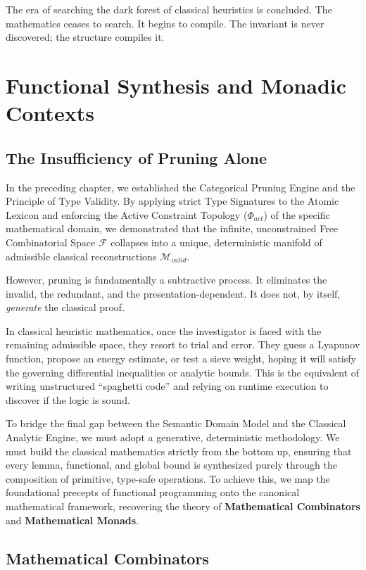 \documentclass[12pt,openany]{extbook}
\theoremstyle{plain}
\theoremstyle{definition}
\begin{document}
The era of searching the dark forest of classical heuristics is concluded. The mathematics ceases to search. It begins to compile. The invariant is never discovered; the structure compiles it.

\chapter{Functional Synthesis and Monadic Contexts}

\section{The Insufficiency of Pruning Alone}

In the preceding chapter, we established the Categorical Pruning Engine and the Principle of Type Validity. By applying strict Type Signatures to the Atomic Lexicon and enforcing the Active Constraint Topology ($\Phi_{act}$) of the specific mathematical domain, we demonstrated that the infinite, unconstrained Free Combinatorial Space $\mathcal{F}$ collapses into a unique, deterministic manifold of admissible classical reconstructions $\mathcal{M}_{valid}$.

However, pruning is fundamentally a subtractive process. It eliminates the invalid, the redundant, and the presentation-dependent. It does not, by itself, \emph{generate} the classical proof. 

In classical heuristic mathematics, once the investigator is faced with the remaining admissible space, they resort to trial and error. They guess a Lyapunov function, propose an energy estimate, or test a sieve weight, hoping it will satisfy the governing differential inequalities or analytic bounds. This is the equivalent of writing unstructured ``spaghetti code'' and relying on runtime execution to discover if the logic is sound.

To bridge the final gap between the Semantic Domain Model and the Classical Analytic Engine, we must adopt a generative, deterministic methodology. We must build the classical mathematics strictly from the bottom up, ensuring that every lemma, functional, and global bound is synthesized purely through the composition of primitive, type-safe operations. To achieve this, we map the foundational precepts of functional programming onto the canonical mathematical framework, recovering the theory of \textbf{Mathematical Combinators} and \textbf{Mathematical Monads}.

\section{Mathematical Combinators}
\end{document}
